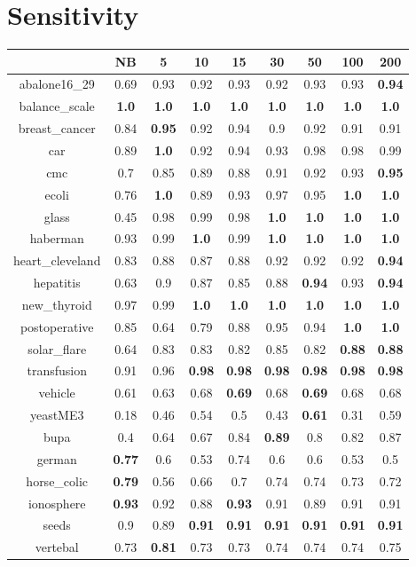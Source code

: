 \documentclass{article}%
\begin{document}
%
\section*{Sensitivity}%
\begin{tabular}{c|cccccccc}%
\hline%
&NB&5&10&15&30&50&100&200\\%
\hline%
abalone16\_29&0.69&0.93&0.92&0.93&0.92&0.93&0.93&\textbf{0.94}\\%
\hline%
balance\_scale&\textbf{1.0}&\textbf{1.0}&\textbf{1.0}&\textbf{1.0}&\textbf{1.0}&\textbf{1.0}&\textbf{1.0}&\textbf{1.0}\\%
\hline%
breast\_cancer&0.84&\textbf{0.95}&0.92&0.94&0.9&0.92&0.91&0.91\\%
\hline%
car&0.89&\textbf{1.0}&0.92&0.94&0.93&0.98&0.98&0.99\\%
\hline%
cmc&0.7&0.85&0.89&0.88&0.91&0.92&0.93&\textbf{0.95}\\%
\hline%
ecoli&0.76&\textbf{1.0}&0.89&0.93&0.97&0.95&\textbf{1.0}&\textbf{1.0}\\%
\hline%
glass&0.45&0.98&0.99&0.98&\textbf{1.0}&\textbf{1.0}&\textbf{1.0}&\textbf{1.0}\\%
\hline%
haberman&0.93&0.99&\textbf{1.0}&0.99&\textbf{1.0}&\textbf{1.0}&\textbf{1.0}&\textbf{1.0}\\%
\hline%
heart\_cleveland&0.83&0.88&0.87&0.88&0.92&0.92&0.92&\textbf{0.94}\\%
\hline%
hepatitis&0.63&0.9&0.87&0.85&0.88&\textbf{0.94}&0.93&\textbf{0.94}\\%
\hline%
new\_thyroid&0.97&0.99&\textbf{1.0}&\textbf{1.0}&\textbf{1.0}&\textbf{1.0}&\textbf{1.0}&\textbf{1.0}\\%
\hline%
postoperative&0.85&0.64&0.79&0.88&0.95&0.94&\textbf{1.0}&\textbf{1.0}\\%
\hline%
solar\_flare&0.64&0.83&0.83&0.82&0.85&0.82&\textbf{0.88}&\textbf{0.88}\\%
\hline%
transfusion&0.91&0.96&\textbf{0.98}&\textbf{0.98}&\textbf{0.98}&\textbf{0.98}&\textbf{0.98}&\textbf{0.98}\\%
\hline%
vehicle&0.61&0.63&0.68&\textbf{0.69}&0.68&\textbf{0.69}&0.68&0.68\\%
\hline%
yeastME3&0.18&0.46&0.54&0.5&0.43&\textbf{0.61}&0.31&0.59\\%
\hline%
bupa&0.4&0.64&0.67&0.84&\textbf{0.89}&0.8&0.82&0.87\\%
\hline%
german&\textbf{0.77}&0.6&0.53&0.74&0.6&0.6&0.53&0.5\\%
\hline%
horse\_colic&\textbf{0.79}&0.56&0.66&0.7&0.74&0.74&0.73&0.72\\%
\hline%
ionosphere&\textbf{0.93}&0.92&0.88&\textbf{0.93}&0.91&0.89&0.91&0.91\\%
\hline%
seeds&0.9&0.89&\textbf{0.91}&\textbf{0.91}&\textbf{0.91}&\textbf{0.91}&\textbf{0.91}&\textbf{0.91}\\%
\hline%
vertebal&0.73&\textbf{0.81}&0.73&0.73&0.74&0.74&0.74&0.75\\%
\hline%
\end{tabular}
\end{document}
